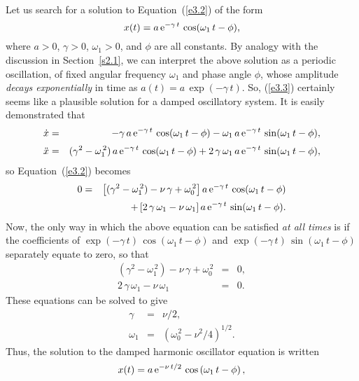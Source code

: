 Let us search for a solution to Equation~(\ref{e3.2}) of the form
\begin{equation}\label{e3.3}
x(t) = a\,{\rm e}^{-\gamma\,t}\,\cos(\omega_1\,t-\phi),
\end{equation}
where $a>0$, $\gamma>0$, $\omega_1>0$, and $\phi$ are all constants. By analogy
with the discussion in Section~\ref{s2.1}, we can interpret the 
above solution as a periodic oscillation, of fixed angular frequency $\omega_1$
and phase angle $\phi$, whose amplitude {\em decays exponentially}\/ in
time as $a(t)=a\,\exp(-\gamma\,t)$. So,  (\ref{e3.3}) certainly seems like a plausible solution for
a damped oscillatory system. It is easily demonstrated that
\begin{eqnarray}
\dot{x} &=& - \gamma\,a\,{\rm e}^{-\gamma\,t}\,\cos(\omega_1\,t-\phi) -\omega_1\, a\,{\rm e}^{-\gamma\,t}\,\sin(\omega_1\,t-\phi),\\[0.5ex]
\ddot{x} &=& (\gamma^2-\omega_1^{\,2})\,a\,{\rm e}^{-\gamma\,t}\,\cos(\omega_1\,t-\phi) +2\,\gamma\,\omega_1\, a\,{\rm e}^{-\gamma\,t}\,\sin(\omega_1\,t-\phi),
\end{eqnarray}
so Equation~(\ref{e3.2}) becomes
\begin{eqnarray}
 0&=&\left[ (\gamma^2-\omega_1^{\,2})  -\nu\,\gamma + \omega_0^{\,2}\right]a\,{\rm e}^{-\gamma\,t}\,\cos(\omega_1\,t-\phi) \nonumber\\[0.5ex]
 &&+\left[2\,\gamma\,\omega_1-\nu\,\omega_1\right] a\,{\rm e}^{-\gamma\,t}\,\sin(\omega_1\,t-\phi).
 \end{eqnarray}
 Now, the only way in which the above equation can be satisfied {\em at all times}\/ is if the
 coefficients of $\exp(-\gamma\,t)\,\cos(\omega_1\,t-\phi)$ and $\exp(-\gamma\,t)\,\sin(\omega_1\,t-\phi)$ separately equate to zero, so that
  \begin{eqnarray}
 (\gamma^2-\omega_1^{\,2}) -\nu\,\gamma+\omega_0^{\,2}&=&0,\\[0.5ex]
2\,\gamma\,\omega_1-\nu\,\omega_1&=&0.
 \end{eqnarray}
 These equations can be solved to give
 \begin{eqnarray}
 \gamma&=& \nu/2,\\[0.5ex]
 \omega_1 &=&(\omega_0^{\,2}-\nu^2/4)^{1/2}.
 \end{eqnarray}
 Thus, the solution to the damped harmonic oscillator equation is written
 \begin{equation}\label{e3.11}
 x(t) = a\,{\rm e}^{-\nu\,t/2}\,\cos\left(\omega_1 \,t-\phi\right),
 \end{equation}
